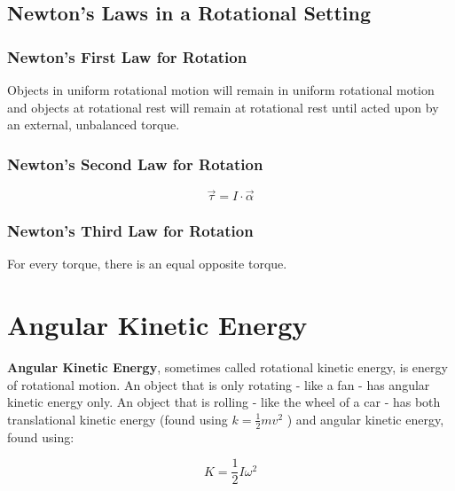 	
	
	
	
	
	
	\subsection{Newton's Laws in a Rotational Setting}
	
	\subsubsection{Newton's First Law for Rotation}
	Objects in uniform rotational motion will remain in uniform rotational motion and objects at rotational rest will remain at rotational rest until acted upon by an external, unbalanced torque.  
	
	\subsubsection{Newton's Second Law for Rotation}
			\begin{mdframed}[backgroundcolor=orange!20!white]
		\begin{equation}
			\vec{\tau} = I \cdot \vec{\alpha}
			\label{equation:newtonssecondrotational}
		\end{equation}
	\end{mdframed}
	
	\subsubsection{Newton's Third Law for Rotation}
	For every torque, there is an equal opposite torque.
	
	
	\section{Angular Kinetic Energy}
	
	\textbf{Angular Kinetic Energy}, sometimes called rotational kinetic energy, is energy of rotational motion.  An object that is only rotating - like a fan - has angular kinetic energy only.  An object that is rolling - like the wheel of a car - has both translational kinetic energy (found using $k = \frac{1}{2}mv^2$ ) and angular kinetic energy, found using:
	
				\begin{mdframed}[backgroundcolor=orange!20!white]
		\begin{equation}
			K = \frac{1}{2}I\omega^2
			\label{equation:rotationalkineticenergy}
		\end{equation}
	\end{mdframed}
	
